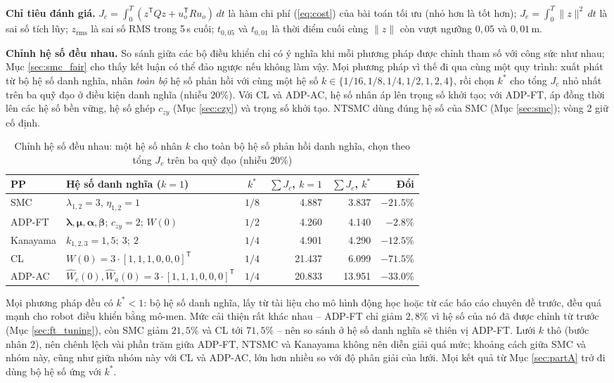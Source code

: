 \documentclass[12pt,a4paper]{article}
\newcommand{\T}{\mathsf{T}}
\begin{document}
\textbf{Chỉ tiêu đánh giá.} $J_c = \int_0^T (z^\T Q z + u_o^\T R u_o)\, dt$ là hàm chi phí (\ref{eq:cost}) của bài toán tối ưu (nhỏ hơn là tốt hơn); $J_e = \int_0^T \|z\|^2\, dt$ là sai số tích lũy; $z_\text{rms}$ là sai số RMS trong 5\,s cuối; $t_{0,05}$ và $t_{0,01}$ là thời điểm cuối cùng $\|z\|$ còn vượt ngưỡng $0{,}05$ và $0{,}01$\,m.

\textbf{Chỉnh hệ số đều nhau.} So sánh giữa các bộ điều khiển chỉ có ý nghĩa khi mỗi phương pháp được chỉnh tham số với công sức như nhau; Mục \ref{sec:smc_fair} cho thấy kết luận có thể đảo ngược nếu không làm vậy. Mọi phương pháp vì thế đi qua cùng một quy trình: xuất phát từ bộ hệ số danh nghĩa, nhân \textit{toàn bộ} hệ số phản hồi với cùng một hệ số $k \in \{1/16, 1/8, 1/4, 1/2, 1, 2, 4\}$, rồi chọn $k^*$ cho tổng $J_c$ nhỏ nhất trên ba quỹ đạo ở điều kiện danh nghĩa (nhiễu 20\%). Với CL và ADP-AC, hệ số nhân áp lên trọng số khởi tạo; với ADP-FT, áp đồng thời lên các hệ số bền vững, hệ số ghép $c_{zy}$ (Mục \ref{sec:czy}) và trọng số khởi tạo. NTSMC dùng đúng hệ số của SMC (Mục \ref{sec:smc}); vòng 2 giữ cố định.

\begin{table}[H]
\centering
\caption{Chỉnh hệ số đều nhau: một hệ số nhân $k$ cho toàn bộ hệ số phản hồi danh nghĩa, chọn theo tổng $J_c$ trên ba quỹ đạo (nhiễu 20\%)}
\label{tab:gain_tuning}
\small
\setlength{\tabcolsep}{5pt}
\begin{tabular}{llcrrr}
\toprule
\textbf{PP} & \textbf{Hệ số danh nghĩa ($k = 1$)} & $k^*$ & $\sum J_c$, $k = 1$ & $\sum J_c$, $k^*$ & \textbf{Đổi} \\
\midrule
SMC & $\lambda_{1,2} = 3$, $\eta_{1,2} = 1$ & $1/8$ & 4.887 & 3.837 & $-21.5\%$ \\
ADP-FT & $\bm\lambda, \bm\mu, \bm\alpha, \bm\beta$; $c_{zy} = 2$; $W(0)$ & $1/2$ & 4.260 & 4.140 & $-2.8\%$ \\
Kanayama & $k_{1,2,3} = 1{,}5;\ 3;\ 2$ & $1/4$ & 4.901 & 4.290 & $-12.5\%$ \\
CL & $W(0) = 3\cdot[1, 1, 1, 0, 0, 0]^\T$ & $1/4$ & 21.437 & 6.099 & $-71.5\%$ \\
ADP-AC & $\hat W_{c}(0), \hat W_{a}(0) = 3\cdot[1, 1, 1, 0, 0, 0]^\T$ & $1/4$ & 20.833 & 13.951 & $-33.0\%$ \\
\bottomrule
\end{tabular}
\end{table}

Mọi phương pháp đều có $k^* < 1$: bộ hệ số danh nghĩa, lấy từ tài liệu cho mô hình động học hoặc từ các báo cáo chuyên đề trước, đều quá mạnh cho robot điều khiển bằng mô-men. Mức cải thiện rất khác nhau -- ADP-FT chỉ giảm $2{,}8\%$ vì hệ số của nó đã được chỉnh từ trước (Mục \ref{sec:ft_tuning}), còn SMC giảm $21{,}5\%$ và CL tới $71{,}5\%$ -- nên so sánh ở hệ số danh nghĩa sẽ thiên vị ADP-FT. Lưới $k$ thô (bước nhân 2), nên chênh lệch vài phần trăm giữa ADP-FT, NTSMC và Kanayama không nên diễn giải quá mức; khoảng cách giữa SMC và nhóm này, cũng như giữa nhóm này với CL và ADP-AC, lớn hơn nhiều so với độ phân giải của lưới. Mọi kết quả từ Mục \ref{sec:partA} trở đi dùng bộ hệ số ứng với $k^*$.
\end{document}
